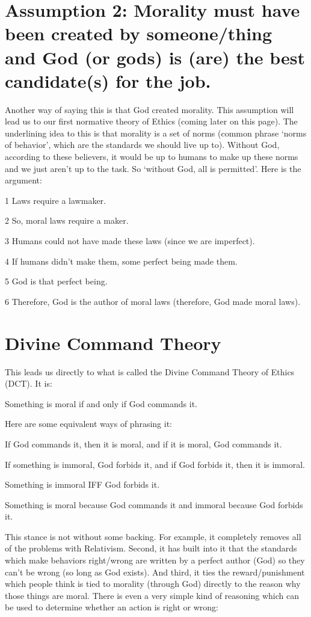 \section{Assumption 2: Morality must have been created by someone/thing and God (or gods) is (are) the best candidate(s) for the job.}

Another way of saying this is that God created morality. This assumption will lead us to our first normative theory of Ethics (coming later on this page). The underlining idea to this is that morality is a set of norms (common phrase ‘norms of behavior’, which are the standards we should live up to). Without God, according to these believers, it would be up to humans to make up these norms and we just aren’t up to the task. So ‘without God, all is permitted’. Here is the argument:
\begin{earg}
    \item[1] Laws require a lawmaker.
    \item[2] So, moral laws require a maker.
    \item[3] Humans could not have made these laws (since we are imperfect).
    \item[4] If humans didn’t make them, some perfect being made them.
    \item[5] God is that perfect being.
    \item[6] Therefore, God is the author of moral laws (therefore, God made moral laws).
\end{earg}

\section{Divine Command Theory}

This leads us directly to what is called the Divine Command Theory of Ethics (DCT). It is:
\begin{center}
Something is moral if and only if God commands it.
\end{center}
Here are some equivalent ways of phrasing it:
\begin{earg}
    \item If God commands it, then it is moral, and if it is moral, God commands it.
    \item If something is immoral, God forbids it, and if God forbids it, then it is immoral.
    \item Something is immoral IFF God forbids it.
    \item Something is moral because God commands it and immoral because God forbids it.
\end{earg}
This stance is not without some backing. For example, it completely removes all of the problems with Relativism. Second, it has built into it that the standards which make behaviors right/wrong are written by a perfect author (God) so they can’t be wrong (so long as God exists). And third, it ties the reward/punishment which people think is tied to morality (through God) directly to the reason why those things are moral. There is even a very simple kind of reasoning which can be used to determine whether an action is right or wrong:

